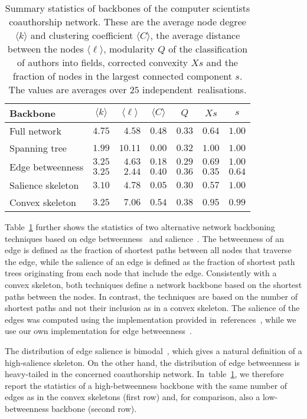 \documentclass[]{rsif}
\newcommand{\avg}[1]{\langle#1\rangle}
\newcommand{\crefs}[1]{references~\cite{#1}\xspace}
\newcommand{\tblref}[1]{table~\ref{tbl:#1}\xspace}
\newcommand{\Tblref}[1]{Table~\ref{tbl:#1}\xspace}
\newcommand{\mc}[1]{\multicolumn{1}{c}{#1}}
\begin{document}
\begin{table}[t]
	\caption{\label{tbl:coauthor}Summary statistics of backbones of the computer scientists coauthorship network. These are the average node degree $\avg{k}$ and clustering coefficient $\avg{C}$, the average distance between the nodes $\avg{\ell}$, modularity $Q$ of the classification of authors into fields, corrected convexity $Xs$ and the fraction of nodes in the largest connected component $s$. The values are averages over $25$ independent~realisations.}
	\begin{tabular}{lcrcccc}
		Backbone & $\avg{k}$ & \mc{$\avg{\ell}$} & $\avg{C}$ & $Q$ & $Xs$ & $s$ \\\hline
		Full network & $4.75$ & $4.58$ & $0.48$ & $0.33$ & $0.64$ & $1.00$ \\
		Spanning tree & $1.99$ & $10.11$ & $0.00$ & $0.32$ & $1.00$ & $1.00$ \\
		\multirow{2}{*}{Edge betweenness} & $3.25$ & $4.63$ & $0.18$ & $0.29$ & $0.69$ & $1.00$ \\
		& $3.25$ & $2.44$ & $0.40$ & $0.36$ & $0.35$ & $0.64$ \\
		Salience skeleton & $3.10$ & $4.78$ & $0.05$ & $0.30$ & $0.57$ & $1.00$ \\
		Convex skeleton & $3.25$ & $7.06$ & $0.54$ & $0.38$ & $0.95$ & $0.99$ \\
	\end{tabular}
\end{table}

\Tblref{coauthor} further shows the statistics of two alternative network backboning techniques based on edge betweenness~\cite{Fre77} and salience~\cite{GTB12}. The betweenness of an edge is defined as the fraction of shortest paths between all nodes that traverse the edge, while the salience of an edge is defined as the fraction of shortest path trees originating from each node that include the edge. Consistently with a convex skeleton, both techniques define a network backbone based on the shortest paths between the nodes. In contrast, the techniques are based on the number of shortest paths and not their inclusion as in a convex skeleton. The salience of the edges was computed using the implementation provided in~\crefs{CN17,backbone}, while we use our own implementation for edge betweenness~\cite{Bra01}.

The distribution of edge salience is bimodal~\cite{GTB12}, which gives a natural definition of a high-salience skeleton. On the other hand, the distribution of edge betweenness is heavy-tailed in the concerned coauthorship network. In~\tblref{coauthor}, we therefore report the statistics of a high-betweenness backbone with the same number of edges as in the convex skeletons (first row) and, for comparison, also a low-betweenness backbone (second row).
\end{document}
